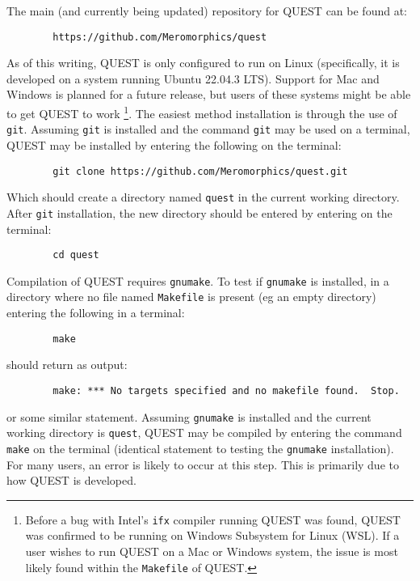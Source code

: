 \documentclass[12pt]{article}
\begin{document}
        \noindent The main (and currently being updated) repository for QUEST can be found at:
        \begin{verbatim}
        https://github.com/Meromorphics/quest
        \end{verbatim}
        As of this writing, QUEST is only configured to run on Linux (specifically, it is developed on a system running Ubuntu 22.04.3 LTS).
        Support for Mac and Windows is planned for a future release, but users of these systems might be able to get QUEST to work \footnote{Before a bug with Intel's \texttt{ifx} compiler running QUEST was found, QUEST was confirmed to be running on Windows Subsystem for Linux (WSL). If a user wishes to run QUEST on a Mac or Windows system, the issue is most likely found within the \texttt{Makefile} of QUEST.}.
        The easiest method installation is through the use of \texttt{git}.
        Assuming \texttt{git} is installed and the command \texttt{git} may be used on a terminal, QUEST may be installed by entering the following on the terminal:
        \begin{verbatim}
        git clone https://github.com/Meromorphics/quest.git
        \end{verbatim}
        Which should create a directory named \texttt{quest} in the current working directory.
        After \texttt{git} installation, the new directory should be entered by entering on the terminal:
        \begin{verbatim}
        cd quest
        \end{verbatim}
        Compilation of QUEST requires \texttt{gnumake}.
        To test if \texttt{gnumake} is installed, in a directory where no file named \texttt{Makefile} is present (eg an empty directory) entering the following in a terminal:
        \begin{verbatim}
        make
        \end{verbatim}
        should return as output:
        \begin{verbatim}
        make: *** No targets specified and no makefile found.  Stop.
        \end{verbatim}
        or some similar statement.
        Assuming \texttt{gnumake} is installed and the current working directory is \texttt{quest}, QUEST may be compiled by entering the command \texttt{make} on the terminal (identical statement to testing the \texttt{gnumake} installation).
        For many users, an error is likely to occur at this step.
        This is primarily due to how QUEST is developed.
\end{document}
